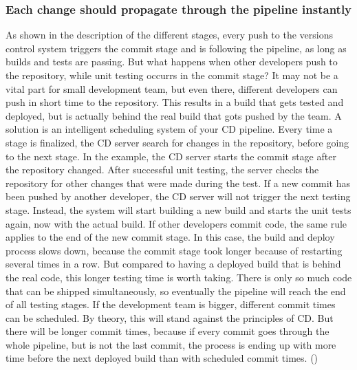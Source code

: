 \subsubsection{Each change should propagate through the pipeline instantly}
As shown in the description of the different stages, every push to the versions control system triggers the commit stage and is following the pipeline, as long as
builds and tests are passing. But what happens when other developers push to the repository, while unit testing occurrs in the commit stage? It may not be a vital
part for small development team, but even there, different developers can push in short time to the repository. This results
in a build that gets tested and deployed, but is actually behind the real build that gots pushed by the team. A solution is an intelligent scheduling
system of your CD pipeline. Every time a stage is finalized, the CD server search for changes in the repository, before going to the next stage. In the
example, the CD server starts the commit stage after the repository changed. After successful unit
testing, the server checks the repository for other changes that were made during the test. If a new commit has been pushed by another developer,
the CD server will not trigger the next testing stage. Instead, the system will start building a new build and starts the unit tests again, now with the actual build.
If other developers commit code, the same rule applies to the end of the new commit stage. In this case, the build and deploy process slows down, because the commit stage
took longer because of restarting several times in a row. But compared to having a deployed build that is behind the real code, this longer testing time is worth taking.
There is only so much code that can be shipped simultaneously, so eventually the pipeline will reach the end of all testing stages. If the development team is bigger,
different commit times can be scheduled. By theory, this will stand against the principles of CD. But there will be longer commit times, because if every commit goes through
the whole pipeline, but is not the last commit, the process is ending up with more time before the next deployed build than with scheduled commit times.
(\cite{humble2010continuous})

